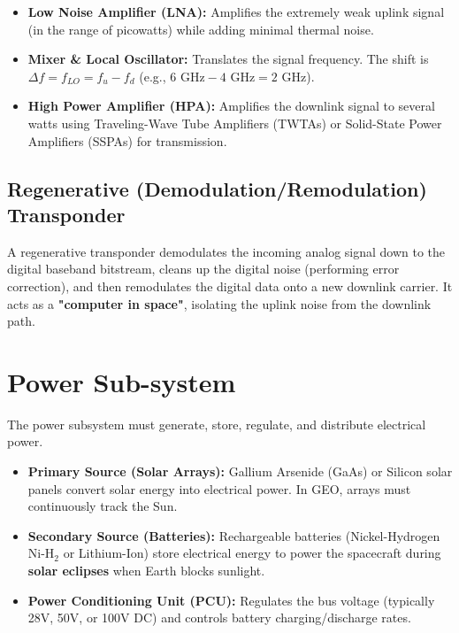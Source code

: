 \documentclass[12pt,a4paper]{article}
\begin{document}
\begin{itemize}[leftmargin=*, itemsep=3.5pt]
  \item \textbf{Low Noise Amplifier (LNA):} Amplifies the extremely weak uplink signal (in the range of picowatts) while adding minimal thermal noise.
  \item \textbf{Mixer \& Local Oscillator:} Translates the signal frequency. The shift is $\Delta f = f_{LO} = f_u - f_d$ (e.g., $6 \text{ GHz} - 4 \text{ GHz} = 2 \text{ GHz}$).
  \item \textbf{High Power Amplifier (HPA):} Amplifies the downlink signal to several watts using Traveling-Wave Tube Amplifiers (TWTAs) or Solid-State Power Amplifiers (SSPAs) for transmission.
\end{itemize}

\subsection{Regenerative (Demodulation/Remodulation) Transponder}
A regenerative transponder demodulates the incoming analog signal down to the digital baseband bitstream, cleans up the digital noise (performing error correction), and then remodulates the digital data onto a new downlink carrier.
It acts as a \textbf{"computer in space"}, isolating the uplink noise from the downlink path.

\section{Power Sub-system}

The power subsystem must generate, store, regulate, and distribute electrical power.
\begin{itemize}[leftmargin=*, itemsep=3.5pt]
  \item \textbf{Primary Source (Solar Arrays):} Gallium Arsenide (GaAs) or Silicon solar panels convert solar energy into electrical power. In GEO, arrays must continuously track the Sun.
  \item \textbf{Secondary Source (Batteries):} Rechargeable batteries (Nickel-Hydrogen $\text{Ni-H}_2$ or Lithium-Ion) store electrical energy to power the spacecraft during \textbf{solar eclipses} when Earth blocks sunlight.
  \item \textbf{Power Conditioning Unit (PCU):} Regulates the bus voltage (typically 28V, 50V, or 100V DC) and controls battery charging/discharge rates.
\end{itemize}
\end{document}
